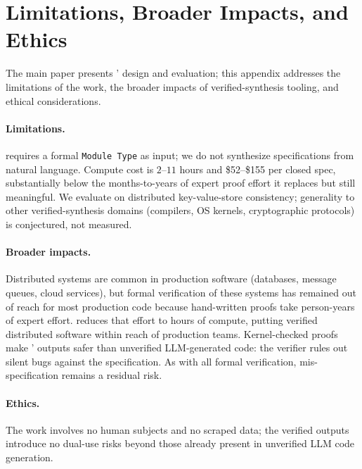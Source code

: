 \section{Limitations, Broader Impacts, and Ethics}
\label{app:limitations-impacts}

The main paper presents \sys{}' design and evaluation; this appendix addresses the limitations of the work, the broader impacts of verified-synthesis tooling, and ethical considerations.

\paragraph{Limitations.}
\sys{} requires a formal \coq{} \texttt{Module Type} as input; we do not synthesize specifications from natural language. Compute cost is $2$--$11$ hours and \$52--\$155 per closed spec, substantially below the months-to-years of expert proof effort it replaces but still meaningful. We evaluate on distributed key-value-store consistency; generality to other verified-synthesis domains (compilers, OS kernels, cryptographic protocols) is conjectured, not measured.

\paragraph{Broader impacts.}
Distributed systems are common in production software (databases, message queues, cloud services), but formal verification of these systems has remained out of reach for most production code because hand-written proofs take person-years of expert effort. \sys{} reduces that effort to hours of compute, putting verified distributed software within reach of production teams. Kernel-checked proofs make \sys{}' outputs safer than unverified LLM-generated code: the verifier rules out silent bugs against the specification. As with all formal verification, mis-specification remains a residual risk.

\paragraph{Ethics.}
The work involves no human subjects and no scraped data; the verified outputs introduce no dual-use risks beyond those already present in unverified LLM code generation.
